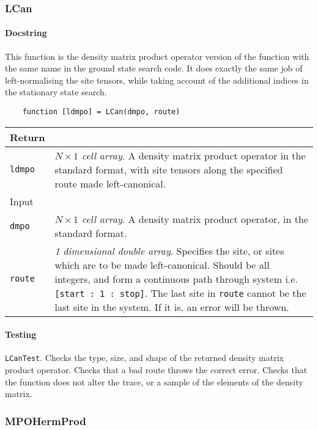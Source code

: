  \subsubsection{LCan}
 \paragraph{Docstring} This function is the density matrix product operator version of the function with the same name in the ground state search code. It does exactly the same job of left-normalising the site tensors, while taking account of the additional indices in the stationary state search.
 \begin{lstlisting}
 	function [ldmpo] = LCan(dmpo, route) \end{lstlisting}
 \begin{longtabu}{X[1,l]X[4,l]}
 \hline
 Return & \\ \hline
 \lstinline$ldmpo$ & \emph{\(N \times 1\) cell array}. A density matrix product operator in the standard format, with site tensors along the specified route made left-canonical. \\ \hline
 Input & \\
 \lstinline$dmpo$ & \emph{\(N \times 1\) cell array}. A density matrix product operator, in the standard format. \\
 \lstinline$route$ & \emph{1 dimensional double array}. Specifies the site, or sites which are to be made left-canonical. Should be all integers, and form a continuous path through system i.e. \lstinline$[start : 1 : stop]$. The last site in \lstinline$route$ cannot be the last site in the system. If it is, an error will be thrown. \\
 \hline
 \end{longtabu} 
 \paragraph{Testing} \lstinline$LCanTest$. Checks the type, size, and shape of the returned density matrix product operator. Checks that a bad route throws the correct error. Checks that the function does not alter the trace, or a sample of the elements of the density matrix. 
 
 \subsubsection{MPOHermProd}

